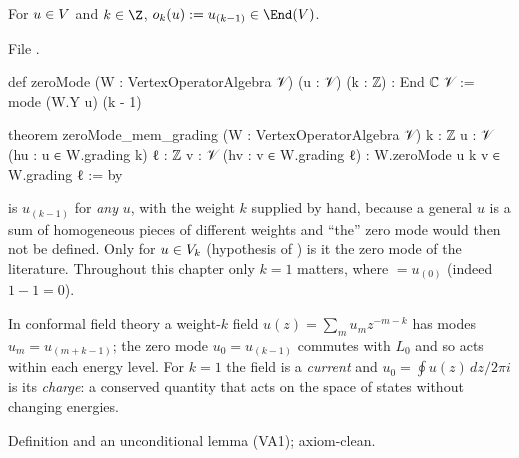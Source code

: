\begin{definition}\label{l04:def:zeromode}
For $u\in V$ and $k\in\Z$, $o_k(u) := u_{(k-1)}\in\End(\lfourV)$.
\end{definition}
\noindent File .
\begin{leancode}
def zeroMode (W : VertexOperatorAlgebra 𝒱) (u : 𝒱) (k : ℤ) : End ℂ 𝒱 :=
  mode (W.Y u) (k - 1)

theorem zeroMode_mem_grading (W : VertexOperatorAlgebra 𝒱) {k : ℤ} {u : 𝒱}
    (hu : u ∈ W.grading k) {ℓ : ℤ} {v : 𝒱} (hv : v ∈ W.grading ℓ) :
    W.zeroMode u k v ∈ W.grading ℓ := by
\end{leancode}
\begin{dictionary}
 is $u_{(k-1)}$ for \emph{any} $u$, with the weight $k$ supplied by hand,
because a general $u$ is a sum of homogeneous pieces of different weights and ``the'' zero mode
would then not be defined. Only for $u\in V_k$ (hypothesis  of
\allowbreak{}\allowbreak{}) is it the zero mode of the literature. Throughout this chapter only
$k = 1$ matters, where  $= u_{(0)}$ (indeed $1-1 = 0$).
\end{dictionary}
\begin{physics}
In conformal field theory a weight-$k$ field $u(z) = \sum_m u_m z^{-m-k}$ has modes $u_m =
u_{(m+k-1)}$; the zero mode $u_0 = u_{(k-1)}$ commutes with $L_0$ and so acts within each energy
level. For $k = 1$ the field is a \emph{current} and $u_0 = \oint u(z)\,dz/2\pi i$ is its
\emph{charge}: a conserved quantity that acts on the space of states without changing energies.
\end{physics}
\begin{status}
Definition and an unconditional lemma (VA1); axiom-clean.
\end{status}

